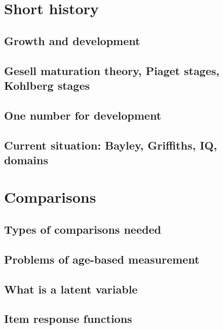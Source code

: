\documentclass[]{book}
\begin{document}
\chapter{Short history}\label{short-history}

\section{Growth and development}\label{growth-and-development}

\section{Gesell maturation theory, Piaget stages, Kohlberg
stages}\label{gesell-maturation-theory-piaget-stages-kohlberg-stages}

\section{One number for development}\label{one-number-for-development}

\section{Current situation: Bayley, Griffiths, IQ,
domains}\label{current-situation-bayley-griffiths-iq-domains}

\chapter{Comparisons}\label{comparisons}

\section{Types of comparisons needed}\label{types-of-comparisons-needed}

\section{Problems of age-based
measurement}\label{problems-of-age-based-measurement}

\section{What is a latent variable}\label{what-is-a-latent-variable}

\section{Item response functions}\label{item-response-functions}
\end{document}
